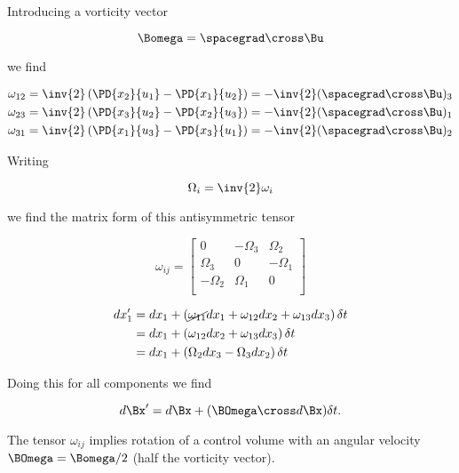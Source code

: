 Introducing a vorticity vector

\begin{equation}\label{eqn:continuumL8:350}
\Bomega = \spacegrad \cross \Bu
\end{equation}

we find

\begin{align}\label{eqn:continuumL8:370}
\omega_{12} &= \inv{2}\left( \PD{x_2}{u_1} -\PD{x_1}{u_2} \right) = - \inv{2} (\spacegrad \cross \Bu)_3 \\
\omega_{23} &= \inv{2}\left( \PD{x_3}{u_2} -\PD{x_2}{u_3} \right) = - \inv{2} (\spacegrad \cross \Bu)_1 \\
\omega_{31} &= \inv{2}\left( \PD{x_1}{u_3} -\PD{x_3}{u_1} \right) = - \inv{2} (\spacegrad \cross \Bu)_2
\end{align}

Writing

\begin{equation}\label{eqn:continuumL8:390}
\Omega_i = \inv{2} \omega_i
\end{equation}

we find the matrix form of this antisymmetric tensor

\begin{equation}\label{eqn:continuumL8:410}
\omega_{ij}
=
\begin{bmatrix}
0 & -\Omega_3 & \Omega_2 \\
\Omega_3 & 0 & -\Omega_1 \\
-\Omega_2 & \Omega_1 & 0 \\
\end{bmatrix}
\end{equation}

\begin{align*}
dx_1'
&= dx_1 + \left( \cancel{\omega_{11}} dx_1 + \omega_{12} dx_2 + \omega_{13} dx_3 \right) \delta t \\
&= dx_1 + \left( \omega_{12} dx_2 + \omega_{13} dx_3 \right) \delta t \\
&= dx_1 + \left( \Omega_2 dx_3 - \Omega_3 dx_2 \right) \delta t
\end{align*}

Doing this for all components we find

\begin{equation}\label{eqn:continuumL8:430}
d\Bx' = d\Bx + (\BOmega \cross d\Bx) \delta t.
\end{equation}

The tensor $\omega_{ij}$ implies rotation of a control volume with an angular velocity $\BOmega = \Bomega/2$ (half the vorticity vector).

